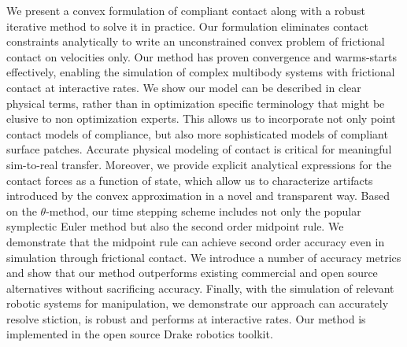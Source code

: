 We present a convex formulation of compliant contact along with a robust
iterative method to solve it in practice. Our formulation eliminates contact
constraints analytically to write an unconstrained convex problem of
frictional contact on velocities only. Our method has proven convergence and
warms-starts effectively, enabling the simulation of complex multibody systems
with frictional contact at interactive rates. We show our model can be described
in clear physical terms, rather than in optimization specific terminology that
might be elusive to non optimization experts. This allows us to incorporate not
only point contact models of compliance, but also more sophisticated models of
compliant surface patches. Accurate physical modeling of contact is critical for
meaningful sim-to-real transfer. Moreover, we provide explicit analytical
expressions for the contact forces as a function of state, which allow us to
characterize artifacts introduced by the convex approximation in a novel and
transparent way. Based on the $\theta\text{-method}$, our time stepping scheme
includes not only the popular symplectic Euler method but also the second order
midpoint rule. We demonstrate that the midpoint rule can achieve second order
accuracy even in simulation through frictional contact. We introduce a number of
accuracy metrics and show that our method outperforms existing commercial and
open source alternatives without sacrificing accuracy. Finally, with the
simulation of relevant robotic systems for manipulation, we demonstrate our
approach can accurately resolve stiction, is robust and performs at interactive
rates. Our method is implemented in the open source Drake robotics toolkit.
